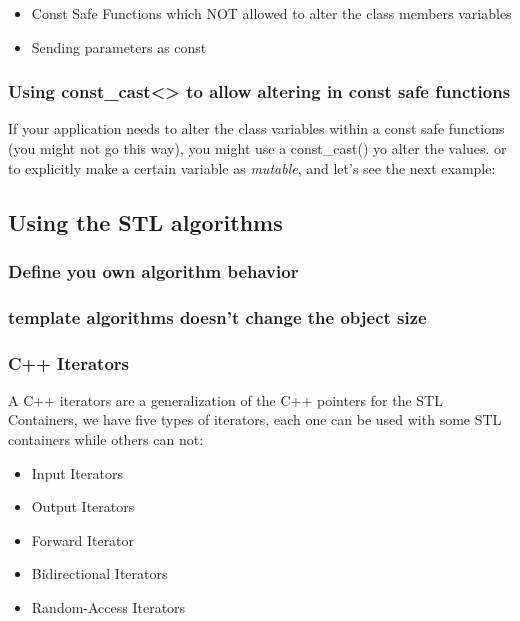 \documentclass{article}
\begin{document}
\begin{itemize}
  \item Const Safe Functions which NOT allowed to alter the class members variables
  \item Sending parameters as const
\end{itemize}



\subsubsection{Using const\_cast<> to allow altering in const safe functions}
If your application needs to alter the class variables within a const safe functions (you might not go this way), you might use a const\_cast() yo alter the values. or to explicitly make a certain variable as \textit{mutable}, and let's see the next example:



\subsection{Using the STL algorithms}
\subsubsection{Define you own algorithm behavior}


\subsubsection{template algorithms doesn't change the object size}


\subsubsection{C++ Iterators}
A C++ iterators are a generalization of the C++ pointers for the STL Containers, we have five types of iterators, each one can be used with some STL containers while others can not:
\begin{itemize}
  \item Input Iterators
  \item Output Iterators
  \item Forward Iterator
  \item Bidirectional Iterators
  \item Random-Access Iterators
\end{itemize}
\end{document}
